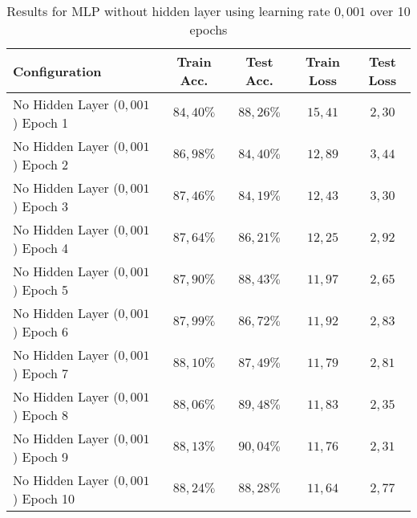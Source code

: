 \documentclass[a4paper]{article}
\begin{document}
\begin{table}[h!]
\centering
\begin{tabular}{|l|c|c|c|c|}
\hline
\textbf{Configuration} & \textbf{Train Acc.} & \textbf{Test Acc.} & \textbf{Train Loss} & \textbf{Test Loss} \\
\hline
No Hidden Layer ($0{,}001$) Epoch 1 & $84{,}40\%$ & $88{,}26\%$ & $15{,}41$ & $2{,}30$ \\
No Hidden Layer ($0{,}001$) Epoch 2 & $86{,}98\%$ & $84{,}40\%$ & $12{,}89$ & $3{,}44$ \\
No Hidden Layer ($0{,}001$) Epoch 3 & $87{,}46\%$ & $84{,}19\%$ & $12{,}43$ & $3{,}30$ \\
No Hidden Layer ($0{,}001$) Epoch 4 & $87{,}64\%$ & $86{,}21\%$ & $12{,}25$ & $2{,}92$ \\
No Hidden Layer ($0{,}001$) Epoch 5 & $87{,}90\%$ & $88{,}43\%$ & $11{,}97$ & $2{,}65$ \\
No Hidden Layer ($0{,}001$) Epoch 6 & $87{,}99\%$ & $86{,}72\%$ & $11{,}92$ & $2{,}83$ \\
No Hidden Layer ($0{,}001$) Epoch 7 & $88{,}10\%$ & $87{,}49\%$ & $11{,}79$ & $2{,}81$ \\
No Hidden Layer ($0{,}001$) Epoch 8 & $88{,}06\%$ & $89{,}48\%$ & $11{,}83$ & $2{,}35$ \\
No Hidden Layer ($0{,}001$) Epoch 9 & $88{,}13\%$ & $90{,}04\%$ & $11{,}76$ & $2{,}31$ \\
No Hidden Layer ($0{,}001$) Epoch 10 & $88{,}24\%$ & $88{,}28\%$ & $11{,}64$ & $2{,}77$ \\
\hline
\end{tabular}
\caption{Results for MLP without hidden layer using learning rate $0{,}001$ over 10 epochs}
\label{tab:no_hidden_001_results}
\end{table}
\end{document}
